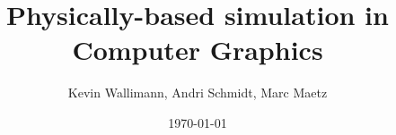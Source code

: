 \documentclass[10pt,a5paper,twoside]{memoir}
\title{\Huge Physically-based simulation in Computer Graphics}
\author{\LARGE Kevin Wallimann, Andri Schmidt, Marc Maetz}
\date{\vspace{1em}\today}
\begin{document}
 

\begin{titlingpage}
\maketitle
\end{titlingpage}







\tableofcontents 
%




\end{document}
